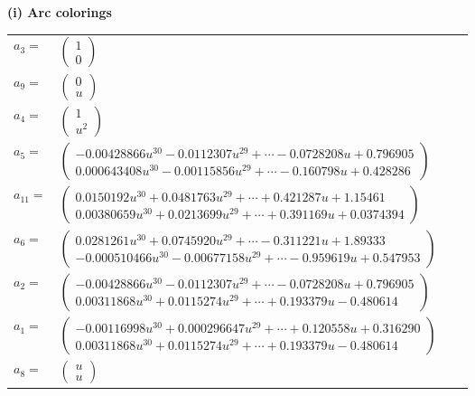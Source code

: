\documentclass[1p]{elsarticle_modified}
\theoremstyle{definition}
\begin{document}
\flushleft \textbf{(i) Arc colorings}\\
\begin{tabular}{m{7pt} m{180pt} m{7pt} m{180pt} }
\flushright $a_{3}=$&$\begin{pmatrix}1\\0\end{pmatrix}$ \\
\flushright $a_{9}=$&$\begin{pmatrix}0\\u\end{pmatrix}$ \\
\flushright $a_{4}=$&$\begin{pmatrix}1\\u^2\end{pmatrix}$ \\
\flushright $a_{5}=$&$\begin{pmatrix}-0.00428866 u^{30}-0.0112307 u^{29}+\cdots-0.0728208 u+0.796905\\0.000643408 u^{30}-0.00115856 u^{29}+\cdots-0.160798 u+0.428286\end{pmatrix}$ \\
\flushright $a_{11}=$&$\begin{pmatrix}0.0150192 u^{30}+0.0481763 u^{29}+\cdots+0.421287 u+1.15461\\0.00380659 u^{30}+0.0213699 u^{29}+\cdots+0.391169 u+0.0374394\end{pmatrix}$ \\
\flushright $a_{6}=$&$\begin{pmatrix}0.0281261 u^{30}+0.0745920 u^{29}+\cdots-0.311221 u+1.89333\\-0.000510466 u^{30}-0.00677158 u^{29}+\cdots-0.959619 u+0.547953\end{pmatrix}$ \\
\flushright $a_{2}=$&$\begin{pmatrix}-0.00428866 u^{30}-0.0112307 u^{29}+\cdots-0.0728208 u+0.796905\\0.00311868 u^{30}+0.0115274 u^{29}+\cdots+0.193379 u-0.480614\end{pmatrix}$ \\
\flushright $a_{1}=$&$\begin{pmatrix}-0.00116998 u^{30}+0.000296647 u^{29}+\cdots+0.120558 u+0.316290\\0.00311868 u^{30}+0.0115274 u^{29}+\cdots+0.193379 u-0.480614\end{pmatrix}$ \\
\flushright $a_{8}=$&$\begin{pmatrix}u\\u\end{pmatrix}$ \\

\end{tabular}
\end{document}
